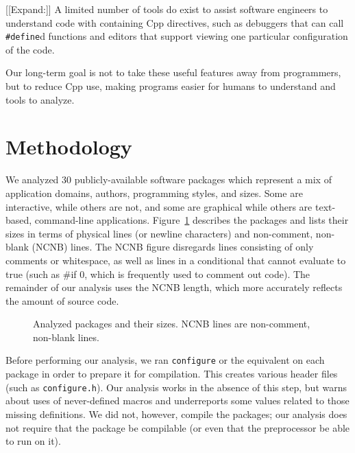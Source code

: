 \documentclass[10pt]{article}
\def\numpackages{30}
\newcommand{\file}[1]{\texttt{#1}}
\begin{document}

[[Expand:]]
A limited number of tools do exist to assist software engineers to
understand code with containing Cpp directives, such as debuggers that can
call {\tt \#define}d functions and editors that support viewing one
particular configuration of the code.

Our long-term goal is not to take these useful features away from
programmers, but to reduce Cpp use, making programs easier for humans to
understand and tools to analyze.






\section{Methodology}
\label{sec:methodology}

We analyzed {\numpackages} publicly-available software packages which
represent a mix of application domains, authors, programming styles, and
sizes.  Some are interactive, while others are not, and some are graphical
while others are text-based, command-line applications.
Figure~\ref{fig:packages} describes the packages and lists their sizes in
terms of physical lines (or newline characters) and non-comment, non-blank
(NCNB) lines.  The NCNB figure disregards lines consisting of only comments
or whitespace, as well as lines in a conditional that cannot evaluate to
true (such as {\#if 0}, which is frequently used to comment out code).  The
remainder of our analysis uses the NCNB length, which more accurately
reflects the amount of source code.

\begin{figure}
\centering
{%
  \small
  \setlength{\tabcolsep}{.25em}
  
}
\caption{Analyzed packages and their sizes.  NCNB lines are non-comment,
  non-blank lines.}
\label{fig:packages}
\end{figure}

Before performing our analysis, we ran {\tt configure} or the equivalent on
each package in order to prepare it for compilation.  This creates various
header files (such as \file{configure.h}).  Our analysis works in the
absence of this step, but warns about uses of never-defined macros and
underreports some values related to those missing definitions.  We did
not, however, compile the packages; our analysis does not require that the
package be compilable (or even that the preprocessor be able to run on it).
\end{document}
